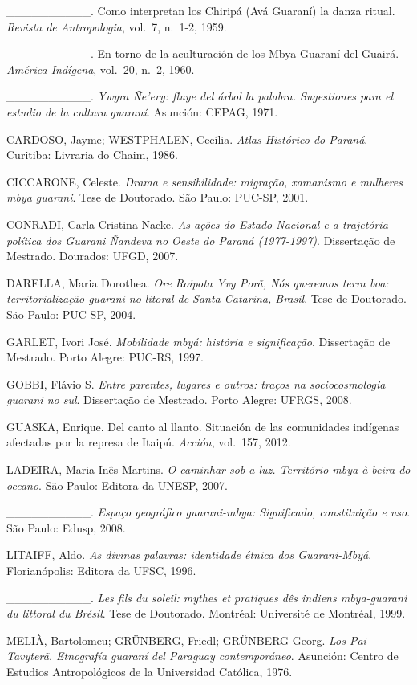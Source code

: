 \_\_\_\_\_\_\_\_\_\_. Como interpretan los Chiripá (Avá Guaraní) la
danza ritual. \emph{Revista de Antropologia}, vol.~7, n.~1-2, 1959.

\_\_\_\_\_\_\_\_\_\_. En torno de la aculturación de los Mbya-Guaraní
del Guairá. \emph{América Indígena}, vol.~20, n.~2, 1960. 

\_\_\_\_\_\_\_\_\_\_. \emph{Ywyra Ñe’ery: fluye del árbol la palabra.
Sugestiones para el estudio de la cultura guaraní}. Asunción: CEPAG,
1971.

CARDOSO, Jayme; WESTPHALEN, Cecília. \emph{Atlas Histórico do Paraná}.
Curitiba: Livraria do Chaim, 1986.

CICCARONE, Celeste. \emph{Drama e sensibilidade: migração, xamanismo e
mulheres mbya guarani}. Tese de Doutorado. São Paulo: PUC-SP, 2001.

CONRADI, Carla Cristina Nacke. \emph{As ações do Estado Nacional e a
trajetória política dos Guarani Ñandeva no Oeste do Paraná (1977-1997)}.
Dissertação de Mestrado. Dourados: UFGD, 2007.

DARELLA, Maria Dorothea. \emph{Ore Roipota Yvy Porã, Nós queremos terra boa:
territorialização guarani no litoral de Santa Catarina, Brasil}. Tese de
Doutorado. São Paulo: PUC-SP, 2004.

GARLET, Ivori José.  \emph{Mobilidade mbyá: história e significação}.
Dissertação de Mestrado. Porto Alegre: PUC-RS, 1997.

GOBBI, Flávio S. \emph{Entre parentes, lugares e outros: traços na
sociocosmologia guarani no sul}. Dissertação de Mestrado. Porto Alegre:
UFRGS, 2008.

GUASKA, Enrique. Del canto al llanto. Situación de las comunidades
indígenas afectadas por la represa de Itaipú. \emph{Acción}, vol.~157, 2012.

LADEIRA, Maria Inês Martins. \emph{O caminhar sob a luz. Território mbya à
beira do oceano}. São Paulo: Editora da UNESP, 2007.

\_\_\_\_\_\_\_\_\_\_. \emph{Espaço geográfico guarani-mbya: Significado,
constituição e uso}. São Paulo: Edusp, 2008.

LITAIFF, Aldo. \emph{As divinas palavras: identidade étnica dos Guarani-Mbyá}.
Florianópolis: Editora da UFSC, 1996.

\_\_\_\_\_\_\_\_\_\_. \emph{Les fils du soleil: mythes et pratiques dês
indiens mbya-guarani du littoral du Brésil}. Tese de Doutorado.
Montréal: Université de Montréal, 1999.

MELIÀ, Bartolomeu; GRÜNBERG, Friedl; GRÜNBERG Georg. \emph{Los Pai-Tavyterã.
Etnografía guaraní del Paraguay contemporáneo}. Asunción: Centro de
Estudios Antropológicos de la Universidad Católica, 1976.

